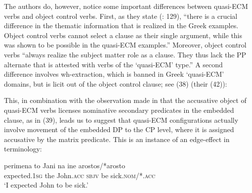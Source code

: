 \documentclass[output=paper]{langsci/langscibook}
\begin{document}
    \z

The authors do, however, notice some important differences between quasi-ECM verbs and object control verbs. First, as they state (\citealt{Kotzoglou2007}: 129), “there is a crucial difference in the thematic information that is realized in the Greek examples. Object control verbs cannot select a clause as their single argument, while this was shown to be possible in the quasi-ECM examples.” Moreover, object control verbs “always realize the subject matter role as a clause. They thus lack the PP alternate that is attested with verbs of the ‘quasi-ECM’ type.” A second difference involves wh-extraction, which is banned in Greek ‘quasi-ECM’ domains, but is licit out of the object control clause; see (38) (their (42)):

\ea%
    \label{ex:alexiadou:43}
    \z
\z

This, in combination with the observation made in \citet{Kotzoglou2007} that the accusative object of quasi-ECM verbs licenses nominative secondary predicates in the embedded clause, as in (39), leads us to suggest that quasi-ECM configurations actually involve movement of the embedded DP to the CP level, where it is assigned accusative by the matrix predicate. This is an instance of an edge-effect in  terminology:

\ea%
    \label{ex:alexiadou:46}
    \gll perimena        to Jani           na    ine arostos/*arosto \\
         expected{}.\textsc{1sg} the John\textsc{{}.acc} \textsc{sbjv} be sick\textsc{{}.nom}/*\textsc{{}.acc} \\
    \glt ‘I expected John to be sick.’ 
    \z
\end{document}
